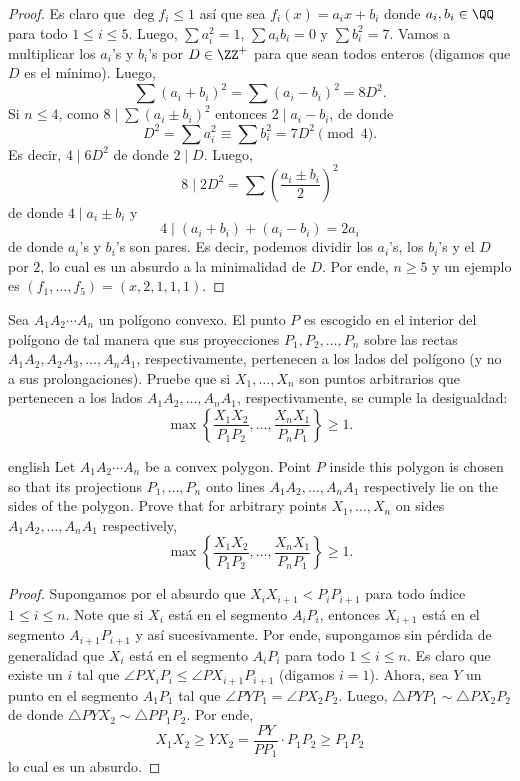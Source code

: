 \begin{proof}
	Es claro que $\deg{f_i}\le 1$ así que sea $f_i(x)=a_ix+b_i$ donde $a_i,b_i\in\QQ$ para todo $1\le i\le 5$. Luego, $\sum a_i^2=1$, $\sum a_ib_i=0$ y $\sum b_i^2=7$. Vamos a multiplicar los $a_i$'s y $b_i$'s por $D\in\ZZ^+$ para que sean todos enteros (digamos que $D$ es el mínimo). Luego,
	\[\sum(a_i+b_i)^2=\sum(a_i-b_i)^2=8D^2.\]
	Si $n\le 4$, como $8\mid\sum(a_i\pm b_i)^2$ entonces $2\mid a_i-b_i$, de donde
	\[D^2=\sum a_i^2\equiv\sum b_i^2=7D^2\pmod 4.\]
	Es decir, $4\mid 6D^2$ de donde $2\mid D$. Luego,
	\[8\mid 2D^2=\sum\left(\frac{a_i\pm b_i}{2}\right)^2\]
	de donde $4\mid a_i\pm b_i$ y
	\[4\mid(a_i+b_i)+(a_i-b_i)=2a_i\]
	de donde $a_i$'s y $b_i$'s son pares. Es decir, podemos dividir los $a_i$'s, los $b_i$'s y el $D$ por $2$, lo cual es un absurdo a la minimalidad de $D$. Por ende, $n\ge 5$ y un ejemplo es $(f_1,\dots,f_5)=(x,2,1,1,1)$.
\end{proof}

\begin{probEG}
	Sea $A_1A_2\cdots A_n$ un polígono convexo. El punto $P$ es escogido en el interior del polígono de tal manera que sus proyecciones $P_1,P_2,\dots,P_n$ sobre las rectas $A_1A_2,A_2A_3,\dots,A_nA_1$, respectivamente, pertenecen a los lados del polígono (y no a sus prolongaciones). Pruebe que si $X_1,\dots,X_n$ son puntos arbitrarios que pertenecen a los lados $A_1A_2,\dots,A_nA_1$, respectivamente, se cumple la desigualdad:
	\[\max\left\{\frac{X_1X_2}{P_1P_2},\dots,\frac{X_nX_1}{P_nP_1}\right\}\ge 1.\]
	\begin{hint}
		\begin{otherlanguage*}{english}
			Let $A_1A_2\cdots A_n$ be a convex polygon. Point $P$ inside this polygon is chosen so that its projections $P_1,\dots,P_n$ onto lines $A_1A_2,\dots,A_nA_1$ respectively lie on the sides of the polygon. Prove that for arbitrary points $X_1,\dots,X_n$ on sides $A_1A_2,\dots,A_nA_1$ respectively,
			\[\max\left\{\frac{X_1X_2}{P_1P_2},\dots,\frac{X_nX_1}{P_nP_1}\right\}\ge 1.\]
		\end{otherlanguage*}
	\end{hint}
\end{probEG}

\begin{proof}
	Supongamos por el absurdo que $X_iX_{i+1}<P_iP_{i+1}$ para todo índice $1\le i\le n$.
	Note que si $X_i$ está en el segmento $A_iP_i$, entonces $X_{i+1}$ está en el segmento $A_{i+1}P_{i+1}$ y así sucesivamente. Por ende, supongamos sin pérdida de generalidad que $X_i$ está en el segmento $A_iP_i$ para todo $1\le i\le n$. Es claro que existe un $i$ tal que $\angle PX_iP_i\le\angle PX_{i+1}P_{i+1}$ (digamos $i=1$). Ahora, sea $Y$ un punto en el segmento $A_1P_1$ tal que $\angle PYP_1=\angle PX_2P_2$. Luego, $\triangle PYP_1\sim\triangle PX_2P_2$ de donde $\triangle PYX_2\sim\triangle PP_1P_2$. Por ende,
	\[X_1X_2\ge YX_2=\frac{PY}{PP_1}\cdot P_1P_2\ge P_1P_2\]
	lo cual es un absurdo.
\end{proof}


